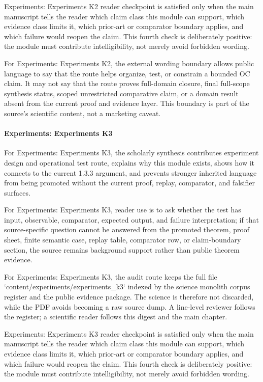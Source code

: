 Experiments: Experiments K2 reader checkpoint is satisfied only when the main manuscript tells the reader which claim class this module can support, which evidence class limits it, which prior-art or comparator boundary applies, and which failure would reopen the claim. This fourth check is deliberately positive: the module must contribute intelligibility, not merely avoid forbidden wording.


For Experiments: Experiments K2, the external wording boundary allows public language to say that the route helps organize, test, or constrain a bounded OC claim. It may not say that the route proves full-domain closure, final full-scope synthesis status, scoped unrestricted comparative claim, or a domain result absent from the current proof and evidence layer. This boundary is part of the source's scientific content, not a marketing caveat.


\paragraph{Experiments: Experiments K3}

For Experiments: Experiments K3, the scholarly synthesis contributes experiment design and operational test route, explains why this module exists, shows how it connects to the current 1.3.3 argument, and prevents stronger inherited language from being promoted without the current proof, replay, comparator, and falsifier surfaces.


For Experiments: Experiments K3, reader use is to ask whether the test has input, observable, comparator, expected output, and failure interpretation; if that source-specific question cannot be answered from the promoted theorem, proof sheet, finite semantic case, replay table, comparator row, or claim-boundary section, the source remains background support rather than public theorem evidence.


For Experiments: Experiments K3, the audit route keeps the full file `content/experiments/experiments\_k3` indexed by the science monolith corpus register and the public evidence package. The science is therefore not discarded, while the PDF avoids becoming a raw source dump. A line-level reviewer follows the register; a scientific reader follows this digest and the main chapter.


Experiments: Experiments K3 reader checkpoint is satisfied only when the main manuscript tells the reader which claim class this module can support, which evidence class limits it, which prior-art or comparator boundary applies, and which failure would reopen the claim. This fourth check is deliberately positive: the module must contribute intelligibility, not merely avoid forbidden wording.



